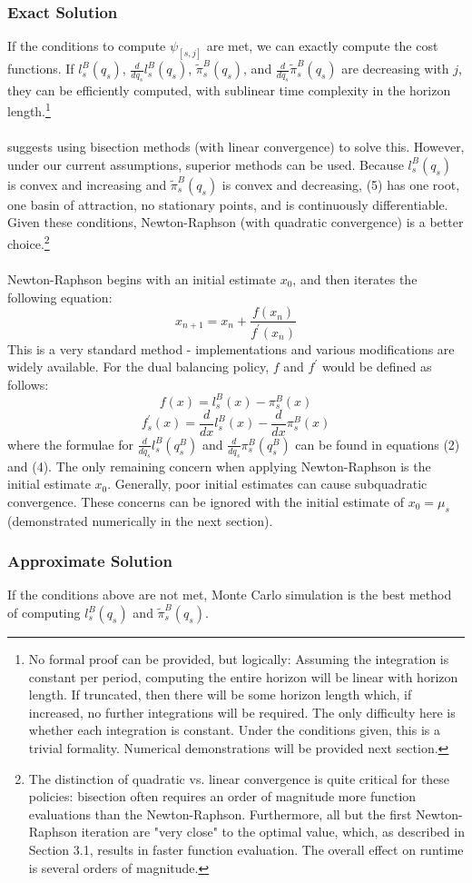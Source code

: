 \documentclass[12pt]{article}
\begin{document}
\subsubsection{Exact Solution}

If the conditions to compute $\psi_{[s, j]}$ are met, we can exactly compute the cost functions. If $l_s^B(q_s)$, $\frac{d}{d q_s} l_s^B(q_s)$, $\tilde{\pi}_s^B(q_s)$, and $\frac{d}{d q_s} \tilde{\pi}_s^B(q_s)$ are decreasing with $j$, they can be efficiently computed, with sublinear time complexity in the horizon length.\footnote{No formal proof can be provided, but logically: Assuming the integration is constant per period, computing the entire horizon will be linear with horizon length. If truncated, then there will be some horizon length which, if increased, no further integrations will be required. The only difficulty here is whether each integration is constant. Under the conditions given, this is a trivial formality. Numerical demonstrations will be provided next section.} \\
\\
\cite{levi:2007} suggests using bisection methods (with linear convergence) to solve this. However, under our current assumptions, superior methods can be used. Because $l_s^B(q_s)$ is convex and increasing and $\tilde{\pi}_s^B(q_s)$ is convex and decreasing, (5) has one root, one basin of attraction, no stationary points, and is continuously differentiable. Given these conditions, Newton-Raphson (with quadratic convergence) is a better choice.\footnote{The distinction of quadratic vs. linear convergence is quite critical for these policies: bisection often requires an order of magnitude more function evaluations than the Newton-Raphson. Furthermore, all but the first Newton-Raphson iteration are "very close" to the optimal value, which, as described in Section 3.1, results in faster function evaluation. The overall effect on runtime is several orders of magnitude.}\\
\\
Newton-Raphson begins with an initial estimate $x_0$, and then iterates the following equation:
$$
	x_{n+1} = x_n + \frac{f(x_n)}{f^{\prime}(x_n)}
$$
This is a very standard method - implementations and various modifications are widely available. For the dual balancing policy, $f$ and $f^{\prime}$ would be defined as follows:
$$
	f(x) = l_s^B(x) - \pi_s^B(x) 
$$
$$
	f_s^{\prime}(x) =  \frac{d}{dx} l_s^B(x) - \frac{d}{dx} \pi_s^B(x) 
$$
where the formulae for $ \frac{d}{d q_s} l_s^B(q_s^B)$ and $ \frac{d}{d q_s} \pi_s^B(q_s^B)$ can be found in equations (2) and (4). The only remaining concern when applying Newton-Raphson is the initial estimate $x_0$. Generally, poor initial estimates can cause subquadratic convergence. These concerns can be ignored with the initial estimate of $x_0 = \mu_s$ (demonstrated numerically in the next section).

\subsubsection{Approximate Solution}

If the conditions above are not met, Monte Carlo simulation is the best method of computing $l_s^B(q_s)$ and $\tilde{\pi}_s^B(q_s)$.



\end{document}
